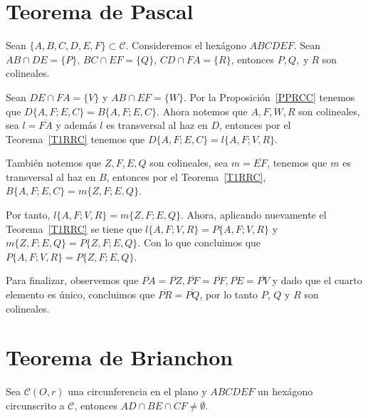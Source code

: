 \section{Teorema de Pascal}
\begin{teo}
Sean $\{A,B,C,D,E,F\}\subset\mathcal{C}$. Consideremos el hexágono $ABCDEF$. Sean $AB\cap DE=\{P\}$, $BC\cap EF=\{Q\}$, $CD\cap FA=\{R\}$, entonces $P,Q,\;\text{y}\;R$ son colineales.
\end{teo}
\begin{dem}
Sean $DE\cap FA=\{V\}$ y $AB\cap EF=\{W\}$.
Por la Proposición~\ref{PPRCC} tenemos que 
$D\{A,F;E,C\}=B\{A,F;E,C\}$. Ahora notemos que $A,F,W,R$ son colineales, sea $l=\overline{FA}$ y además $l$ es transversal al haz en $D$, entonces por el Teorema~\ref{T1RRC} tenemos que $D\{A,F;E,C\}=l\{A,F;V,R\}$.

También notemos que $Z,F,E,Q$ son colineales, sea $m=\overline{EF}$, tenemos que $m$ es transversal al haz en $B$, entonces por el Teorema~\ref{T1RRC},  $B\{A,F;E,C\}=m\{Z,F;E,Q\}$.

Por tanto, $l\{A,F;V,R\}=m\{Z,F;E,Q\}$. Ahora, aplicando nuevamente el Teorema~\ref{T1RRC} se tiene que $l\{A,F;V,R\}=P\{A,F;V,R\}$ y $m\{Z,F;E,Q\}=P\{Z,F;E,Q\}$. Con lo que concluimos que $P\{A,F;V,R\}=P\{Z,F;E,Q\}$.

Para finalizar, observemos que $\overline{PA}=\overline{PZ}, \overline{PF}=\overline{PF}, \overline{PE}=\overline{PV}$  y dado que el cuarto elemento es único, concluimos que $\overline{PR}=\overline{PQ}$, por lo tanto $P$, $Q$ y $R$ son colineales. 
\end{dem}

\section{Teorema de Brianchon}
\begin{teo}
Sea $\mathcal{C}(O,r)$ una circunferencia en el plano y $ABCDEF$ un hexágono circunscrito a $\mathcal{C}$, entonces $AD\cap BE\cap CF\neq\emptyset$.
\end{teo}
